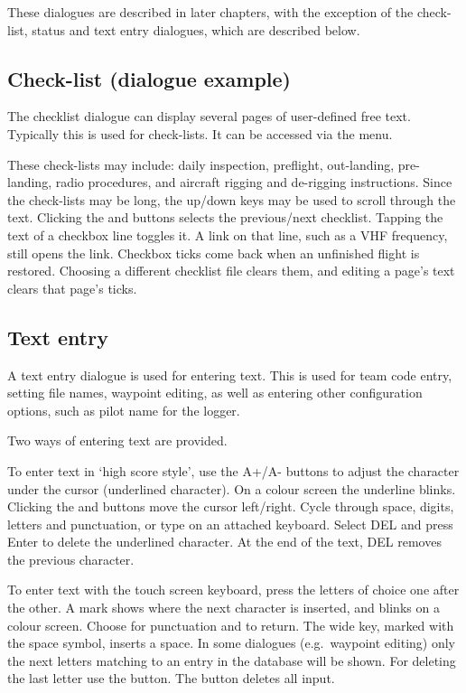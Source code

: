 These dialogues are described in later chapters, with the exception of the
check-list, status and text entry dialogues, which are described below.


\subsection*{Check-list (dialogue example)}\label{sec:checklist}

The checklist dialogue can display several pages of user-defined free text.
Typically this is used for check-lists. It can be accessed via the menu.

\blink{}

These check-lists may include: daily inspection, preflight,
out-landing, pre-landing, radio procedures, and aircraft rigging and
de-rigging instructions.  Since the check-lists may be long, the
up/down keys may be used to scroll through the text. Clicking the
\bmenuw{$<$} and \bmenuw{$>$} buttons selects the previous/next
checklist.  Tapping the text of a checkbox line toggles it.  A link
on that line, such as a VHF frequency, still opens the link.
Checkbox ticks come back when an unfinished flight is restored.
Choosing a different checklist file clears them, and editing a
page's text clears that page's ticks.


\subsection*{Text entry} \label{sec:textentry}

A text entry dialogue is used for entering text.  This is used for team
code entry, setting file names, waypoint editing, as well as entering
other configuration options, such as pilot name for the logger.

Two ways of entering text are provided. 

To enter text in `high score style', use the A+/A- buttons to adjust the 
character under the cursor (underlined character). On a colour screen the
underline blinks. Clicking the \button{$<$} 
and \button{$>$} buttons move the cursor left/right.
Cycle through space, digits, letters and punctuation, or type on an attached
keyboard. Select DEL and press Enter to delete the underlined character.
At the end of the text, DEL removes the previous character.

To enter text with the touch screen keyboard, press the letters of choice 
one after the other. A mark shows where the next character is inserted,
and blinks on a colour screen. Choose \button{\#+=} for punctuation and
 to return. The wide key, marked with the space symbol,
inserts a space. In some dialogues (e.g.\ waypoint editing) only the
next letters matching to an entry in the database will be shown. For deleting the
last letter use the \button{$<-$} button. The  button deletes all input.

